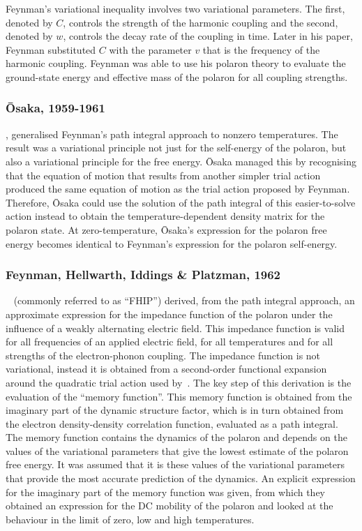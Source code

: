 Feynman's variational inequality involves two variational parameters. The first, denoted by $C$, controls the strength of the harmonic coupling and the second, denoted by $w$, controls the decay rate of the coupling in time. Later in his paper, Feynman substituted $C$ with the parameter $v$ that is the frequency of the harmonic coupling. Feynman was able to use his polaron theory to evaluate the ground-state energy and effective mass of the polaron for all coupling strengths.

\subsubsection{\=Osaka, 1959-1961}
\label{subsubsec:2-1-1-4}

\cite{osaka_polaron_1959, osaka_theory_1961}, generalised Feynman's path integral approach to nonzero temperatures. The result was a variational principle not just for the self-energy of the polaron, but also a variational principle for the free energy. \=Osaka managed this by recognising that the equation of motion that results from another simpler trial action produced the same equation of motion as the trial action proposed by Feynman. Therefore, \=Osaka could use the solution of the path integral of this easier-to-solve action instead to obtain the temperature-dependent density matrix for the polaron state. At zero-temperature, Ōsaka's expression for the polaron free energy becomes identical to Feynman's expression for the polaron self-energy.

\subsubsection{Feynman, Hellwarth, Iddings \& Platzman, 1962}
\label{subsubsec:2-1-1-5}

~\cite{feynman_mobility_1962} (commonly referred to as ``FHIP'') derived, from the path integral approach, an approximate expression for the impedance function of the polaron under the influence of a weakly alternating electric field. This impedance function is valid for all frequencies of an applied electric field, for all temperatures and for all strengths of the electron-phonon coupling. The impedance function is not variational, instead it is obtained from a second-order functional expansion around the quadratic trial action used by~\cite{feynman_slow_1955}. The key step of this derivation is the evaluation of the ``memory function''. This memory function is obtained from the imaginary part of the dynamic structure factor, which is in turn obtained from the electron density-density correlation function, evaluated as a path integral. The memory function contains the dynamics of the polaron and depends on the values of the variational parameters that give the lowest estimate of the polaron free energy. It was assumed that it is these values of the variational parameters that provide the most accurate prediction of the dynamics. An explicit expression for the imaginary part of the memory function was given, from which they obtained an expression for the DC mobility of the polaron and looked at the behaviour in the limit of zero, low and high temperatures.

